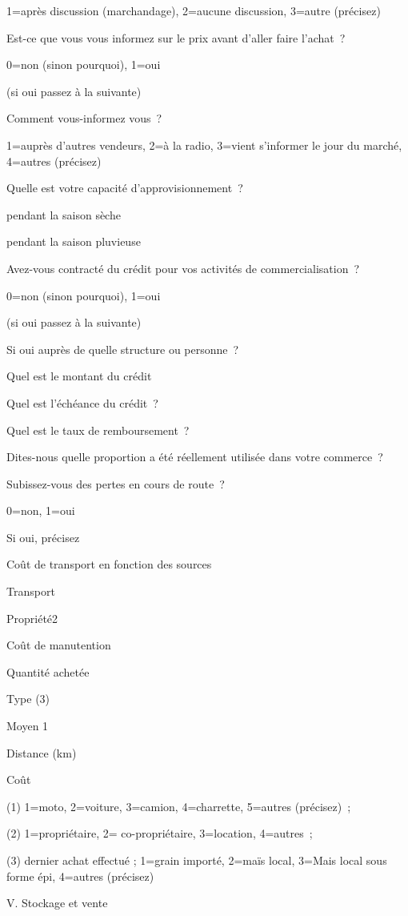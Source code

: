 \documentclass[12pt,oneside]{report}
\begin{document}
1=après discussion (marchandage), 2=aucune discussion, 3=autre (précisez)

Est-ce que vous vous informez sur le prix avant d’aller faire l’achat ?

0=non (sinon pourquoi), 1=oui

(si oui passez à la suivante)

Comment vous-informez vous ?

1=auprès d’autres vendeurs, 2=à la radio, 3=vient s’informer le jour du marché, 4=autres (précisez)

Quelle est votre capacité d’approvisionnement ?

pendant la  saison sèche

pendant la  saison pluvieuse

Avez-vous contracté du crédit pour vos activités de commercialisation ?

0=non (sinon pourquoi), 1=oui

(si oui passez à la suivante)

Si oui  auprès de quelle structure ou personne ?

Quel est le montant du crédit

Quel est l’échéance du crédit ?

Quel est le taux de remboursement ?

Dites-nous quelle proportion a été réellement utilisée dans votre commerce ?

Subissez-vous des pertes en cours de route ?

0=non, 1=oui

Si oui, précisez

Coût de transport en fonction des sources

Transport

Propriété2

Coût de manutention

Quantité achetée

Type (3)

Moyen 1

Distance (km)

Coût

(1) 1=moto, 2=voiture, 3=camion, 4=charrette, 5=autres (précisez) ;

(2) 1=propriétaire, 2= co-propriétaire, 3=location, 4=autres ;

(3) dernier achat effectué ; 1=grain importé, 2=maïs local, 3=Mais local sous forme épi, 4=autres (précisez)

V. Stockage et vente
\end{document}

